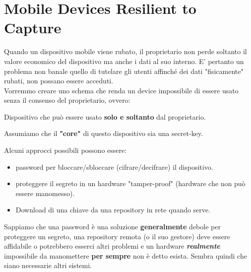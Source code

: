 \chapter{Mobile Devices Resilient to Capture}
Quando un dispositivo mobile viene rubato, il proprietario non perde soltanto il valore economico del dispositivo ma anche i dati al suo interno. E' pertanto un problema non banale quello di tutelare gli utenti affinché dei dati "fisicamente" rubati, non possano essere acceduti.\\
Vorremmo creare uno schema che renda un device impossibile di essere usato senza il consenso del proprietario, ovvero:
\begin{definition}\label{def:resdev}
Dispositivo che può essere usato \textbf{solo e soltanto} dal proprietario.
\end{definition}
\begin{note}
Assumiamo che il \textbf{"core"} di questo dispositivo sia una secret-key.
\end{note}
Alcuni approcci possibili possono essere:
\begin{itemize}
    \item password per bloccare/sbloccare (cifrare/decifrare) il dispositivo.
    \item proteggere il segreto in un hardware "tamper-proof" (hardware che non può essere manomesso).
    \item Download di una chiave da una repository in rete quando serve. 
\end{itemize}
Sappiamo che una password è una soluzione \textbf{generalmente} debole per proteggere un segreto, una repository remota (o il suo gestore) deve essere affidabile o potrebbero esserci altri problemi e un hardware \textbf{\textit{realmente}} impossibile da manomettere \textbf{per sempre} non è detto esista. Sembra quindi che siano necessarie altri sistemi.
